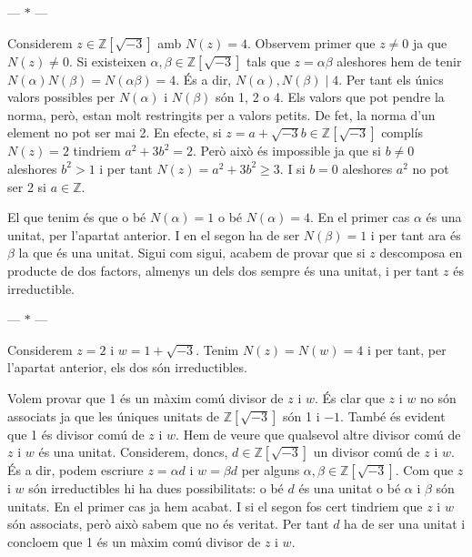 \documentclass[12pt]{article}
\newcommand{\Z}{\mathbb{Z}}
\newcommand{\R}{\Z[\sqrt{-3}]}
\newcommand{\parbreak}{
	\begin{center}
		--- $\ast$ ---
	\end{center} 
}
\begin{document}
\parbreak

Considerem \( z \in \R \) amb \( N(z) = 4 \). Observem primer que \( z \neq 0 \) ja que \( N(z) \neq 0 \). Si existeixen \( \alpha, \beta \in \R \) tals que \( z = \alpha \beta \) aleshores hem de tenir \( N(\alpha) N(\beta) = N(\alpha\beta) = 4 \). És a dir, \( N(\alpha), N(\beta) \mid 4 \). Per tant els únics valors possibles per \( N(\alpha) \) i \( N(\beta) \) són 1, 2 o 4. Els valors que pot pendre la norma, però, estan molt restringits per a valors petits. De fet, la norma d'un element no pot ser mai 2. En efecte, si \( z = a + \sqrt{-3}b \in \R \) complís \( N(z) = 2 \) tindriem \( a^2 + 3b^2 = 2 \). Però això és impossible ja que si \( b \neq 0 \) aleshores \( b^2 > 1 \) i per tant \( N(z) = a^2 + 3b^2 \geq 3 \). I si \( b = 0 \) aleshores \( a^2 \) no pot ser 2 si \( a \in \Z \). 

El que tenim és que o bé \( N(\alpha) = 1 \) o bé \( N(\alpha) = 4 \). En el primer cas \( \alpha \) és una unitat, per l'apartat anterior. I en el segon ha de ser \( N(\beta) = 1 \) i per tant ara és \( \beta \) la que és una unitat. Sigui com sigui, acabem de provar que si \( z \) descomposa en producte de dos factors, almenys un dels dos sempre és una unitat, i per tant \( z \) és irreductible.    

\parbreak

Considerem \( z = 2 \) i \( w = 1 + \sqrt{-3} \). Tenim \( N(z) = N(w) = 4 \) i per tant, per l'apartat anterior, els dos són irreductibles.  

Volem provar que 1 és un màxim comú divisor de \( z \) i \( w \). És clar que \( z \) i \( w \) no són associats ja que les úniques unitats de \( \R \) són 1 i \( -1 \). També és evident que 1 és divisor comú de \( z \) i \( w \). Hem de veure que qualsevol altre divisor comú de \( z \) i \( w \) és una unitat. Considerem, doncs, \( d \in \R \) un divisor comú de \( z \) i \( w \). És a dir, podem escriure \( z = \alpha d \) i \( w = \beta d \) per alguns \( \alpha, \beta \in \R \). Com que \( z \) i \( w \) són irreductibles hi ha dues possibilitats: o bé \( d \) és una unitat o bé \( \alpha \) i \( \beta \) són unitats. En el primer cas ja hem acabat. I si el segon fos cert tindriem que \( z \) i \( w \) són associats, però això sabem que no és veritat. Per tant \( d \) ha de ser una unitat i concloem que 1 és un màxim comú divisor de \( z \) i \( w \).    
\end{document}
